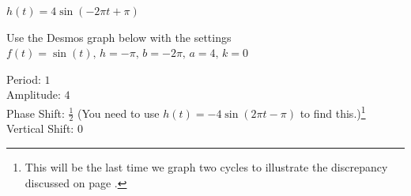 \documentclass{ximera}
\begin{document}
\begin{question}
\begin{problem} \label{sinecosinegraphlast}
$h(t) = 4\sin (-2\pi t + \pi)$  

\begin{solution}
Use the Desmos graph below with the settings $f(t)=\sin(t),\,h=-\pi,\,b=-2\pi,\,a=4,\,k=0$

\begin{center} 
\end{center}

Period: $1$\\
Amplitude: $4$\\
Phase Shift: $\frac{1}{2}$ (You need to use $h(t) =  -4\sin (2\pi t - \pi)$ to find this.)\footnote{This will be the last time we graph two cycles to illustrate the discrepancy discussed on page \pageref{phaseshiftissue}.}\\
Vertical Shift: $0$\\
\end{solution}
\end{problem}

\end{question}
\end{document}
